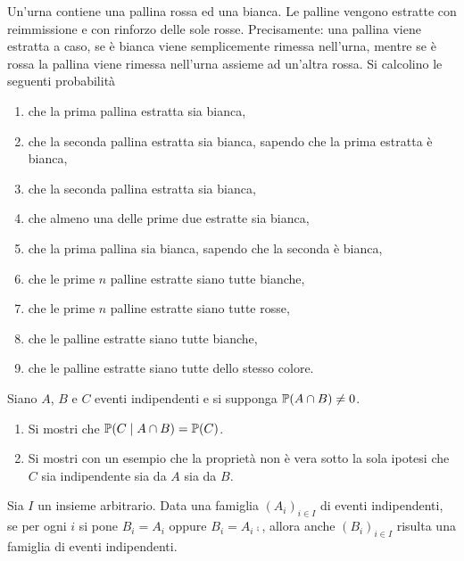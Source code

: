 Un'urna contiene una pallina rossa ed una bianca. Le palline vengono estratte con reimmissione e con rinforzo delle sole rosse. Precisamente: una pallina viene estratta a caso, se è bianca viene semplicemente rimessa nell'urna, mentre se è rossa la pallina viene rimessa nell'urna assieme ad un'altra rossa. Si calcolino le seguenti probabilità
\begin{enumerate}
	\item che la prima pallina estratta sia bianca,
	\item che la seconda pallina estratta sia bianca, sapendo che la prima estratta è bianca,
	\item che la seconda pallina estratta sia bianca,
	\item che almeno una delle prime due estratte sia bianca,
	\item che la prima pallina sia bianca, sapendo che la seconda è bianca,
	\item che le prime $n$ palline estratte siano tutte bianche,
	\item che le prime $n$ palline estratte siano tutte rosse,
	\item che le palline estratte siano tutte bianche,
	\item che le palline estratte siano tutte dello stesso colore.
\end{enumerate}

\Esercizio{}

Siano $A$, $B$ e $C$ eventi indipendenti e si supponga $\mathbb{P}(A\cap B) \neq 0$.
\begin{enumerate}
	\item Si mostri che $\mathbb{P}(C\mid A\cap B) =\mathbb{P}(C)$.
	\item Si mostri con un esempio che la proprietà non è vera sotto la sola ipotesi che $C$ sia indipendente sia da $A$ sia da $B$.
\end{enumerate}

\Esercizio{}

Sia $I$ un insieme arbitrario. Data una famiglia $(A_{i})_{i\in I}$ di eventi indipendenti, se per ogni $i$ si pone $B_{i} =A_{i}$ oppure $B_{i} =A_{i}\comp$, allora anche $(B_{i})_{i\in I}$ risulta una famiglia di eventi indipendenti.

\ParteSoluzioni

\Soluzione

